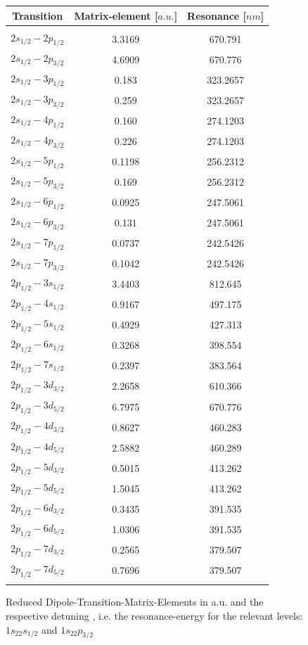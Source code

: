 \begin{figure}[H]
\begin{center}
\begin{tabular}{ccc}
Transition&Matrix-element [$\unit{a.u.}$]&Resonance [$\unit{nm}$]\\\hline\hline\\
$2s_{1/2}-2p_{1/2}$&3.3169&670.791\\
$2s_{1/2}-2p_{3/2}$&4.6909&670.776\\
$2s_{1/2}-3p_{1/2}$&0.183&323.2657\\
$2s_{1/2}-3p_{3/2}$&0.259&323.2657\\
$2s_{1/2}-4p_{1/2}$&0.160&274.1203\\
$2s_{1/2}-4p_{3/2}$&0.226&274.1203\\
$2s_{1/2}-5p_{1/2}$&0.1198&256.2312\\
$2s_{1/2}-5p_{3/2}$&0.169&256.2312\\
$2s_{1/2}-6p_{1/2}$&0.0925&247.5061\\
$2s_{1/2}-6p_{3/2}$&0.131&247.5061\\
$2s_{1/2}-7p_{1/2}$&0.0737&242.5426\\
$2s_{1/2}-7p_{3/2}$&0.1042&242.5426\\
$2p_{1/2}-3s_{1/2}$&3.4403&812.645\\
$2p_{1/2}-4s_{1/2}$&0.9167&497.175\\
$2p_{1/2}-5s_{1/2}$&0.4929&427.313\\
$2p_{1/2}-6s_{1/2}$&0.3268&398.554\\
$2p_{1/2}-7s_{1/2}$&0.2397&383.564\\
$2p_{1/2}-3d_{3/2}$&2.2658&610.366\\
$2p_{1/2}-3d_{5/2}$&6.7975&670.776\\
$2p_{1/2}-4d_{3/2}$&0.8627&460.283\\
$2p_{1/2}-4d_{5/2}$&2.5882&460.289\\
$2p_{1/2}-5d_{3/2}$&0.5015&413.262\\
$2p_{1/2}-5d_{5/2}$&1.5045&413.262\\
$2p_{1/2}-6d_{3/2}$&0.3435&391.535\\
$2p_{1/2}-6d_{5/2}$&1.0306&391.535\\
$2p_{1/2}-7d_{3/2}$&0.2565&379.507\\
$2p_{1/2}-7d_{5/2}$&0.7696&379.507\\\\\hline
\end{tabular}
\end{center}
\caption{Reduced Dipole-Transition-Matrix-Elements \cite{magic01} in a.u. and the respective detuning \cite{NIST_ASD}, i.e. the resonance-energy for the relevant levels: $1s_22s_{1/2}$ and $1s_22p_{3/2}$}
\label{matrixelements}
\end{figure}


